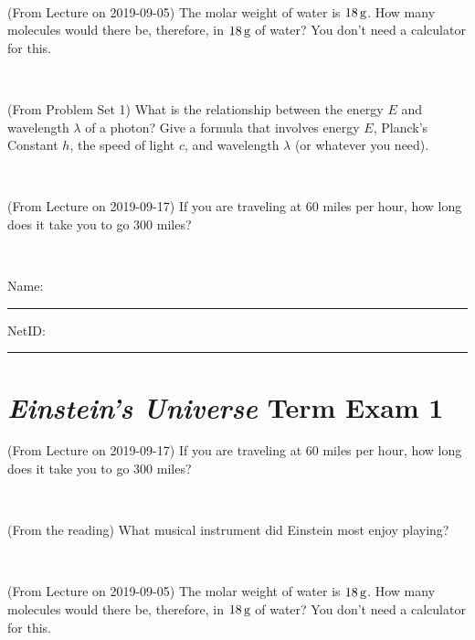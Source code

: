 \documentclass[12pt, letterpaper]{article}
\begin{document}
\vfill ~

\begin{problem} (From Lecture on 2019-09-05)
The molar weight of water is $18\,\mathrm{g}$. How many molecules would there
be, therefore, in $18\,\mathrm{g}$ of water? You don't need a calculator for
this.
\end{problem}


\vfill ~

\begin{problem} (From Problem Set 1)
What is the relationship between the energy $E$ and wavelength
$\lambda$ of a photon? Give a formula that involves energy $E$,
Planck's Constant $h$, the speed of light $c$, and wavelength
$\lambda$ (or whatever you need).
\end{problem}

\vfill ~

\begin{problem} (From Lecture on 2019-09-17)
If you are traveling at 60 miles per hour, how long does
it take you to go 300 miles?
\end{problem}


\vfill ~


\cleardoublepage



\noindent
Name: \rule[-1ex]{0.60\textwidth}{0.1pt}
NetID: \rule[-1ex]{0.20\textwidth}{0.1pt}

\section*{\textsl{Einstein's Universe} Term Exam 1}
\setcounter{problem}{1}


\begin{problem} (From Lecture on 2019-09-17)
If you are traveling at 60 miles per hour, how long does
it take you to go 300 miles?
\end{problem}


\vfill ~

\begin{problem} (From the reading)
What musical instrument did Einstein most enjoy playing?
\end{problem}


\vfill ~

\begin{problem} (From Lecture on 2019-09-05)
The molar weight of water is $18\,\mathrm{g}$. How many molecules would there
be, therefore, in $18\,\mathrm{g}$ of water? You don't need a calculator for
this.
\end{problem}
\end{document}
